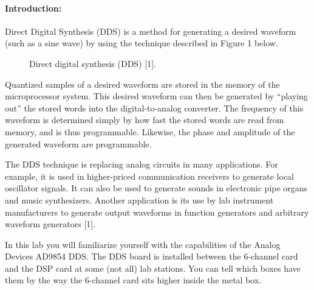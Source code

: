 \paragraph{Introduction: }
Direct Digital Synthesis (DDS) is a method for generating a desired waveform
 (such as a sine wave) by using the technique described in Figure 1 below.

\begin{figure}[htb]
   \begin{center}
        \caption{Direct digital synthesis (DDS) [1].}
      \label{fig:fig1}
   \end{center}
\end{figure}

Quantized samples of a desired waveform are stored in the memory of the
 microprocessor system.  This desired waveform can then be generated by
 ``playing out'' the stored words into the digital-to-analog converter.  
The frequency of this waveform is determined simply by how fast the stored 
words are read from memory, and is thus programmable.  Likewise, the phase 
and amplitude of the generated waveform are programmable.

The DDS technique is replacing analog circuits in many applications.  
For example, it is used in higher-priced communication receivers to generate
 local oscillator signals.  It can also be used to generate sounds in 
electronic pipe organs and music synthesizers.  Another application is
 its use by lab instrument manufacturers to generate output waveforms in 
function generators and arbitrary waveform generators [1].

In this lab you will familiarize yourself with the capabilities of the
 Analog Devices AD9854 DDS.  The DDS board is installed between the 
6-channel card and the DSP card at some (not all) lab stations.  You can tell which boxes have them 
by the way the 6-channel card sits higher inside the metal box.


